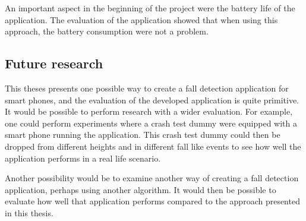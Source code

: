 \documentclass[12pt, a4paper, onecolumn]{article}
\begin{document}
	An important aspect in the beginning of the project were the battery life of the application. The evaluation of the application showed that when using this approach, the battery consumption were not a problem.
	
	\subsection{Future research}
	
	This theses presents one possible way to create a fall detection application for smart phones, and the evaluation of the developed application is quite primitive. It would be possible to perform research with a wider evaluation. For example, one could perform experiments where a crash test dummy were equipped with a smart phone running the application. This crash test dummy could then be dropped from different heights and in different fall like events to see how well the application performs in a real life scenario.
	
	Another possibility would be to examine another way of creating a fall detection application, perhaps using another algorithm. It would then be possible to evaluate how well that application performs compared to the approach presented in this thesis.
	
	\newpage
	
	
	
	
\end{document}
